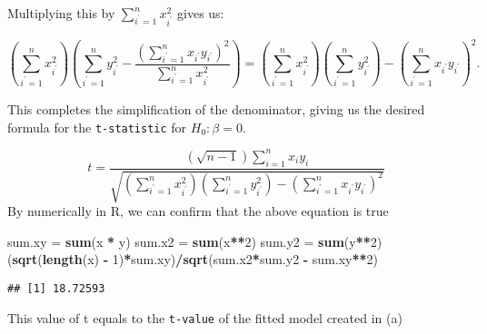 \documentclass[
]{article}
\newenvironment{Shaded}{\begin{snugshade}}{\end{snugshade}}
\newcommand{\DecValTok}[1]{\textcolor[rgb]{0.00,0.00,0.81}{#1}}
\newcommand{\FunctionTok}[1]{\textcolor[rgb]{0.13,0.29,0.53}{\textbf{#1}}}
\newcommand{\NormalTok}[1]{#1}
\newcommand{\OtherTok}[1]{\textcolor[rgb]{0.56,0.35,0.01}{#1}}
\newcommand{\SpecialCharTok}[1]{\textcolor[rgb]{0.81,0.36,0.00}{\textbf{#1}}}
\newcommand{\StringTok}[1]{\textcolor[rgb]{0.31,0.60,0.02}{#1}}
\begin{document}
Multiplying this by \(\sum_{i^{\prime} = 1}^n x_{i^{\prime}}^2\) gives
us:

\[
   \left( \sum_{i^{\prime} = 1}^n x_{i^{\prime}}^2 \right)\left(\sum_{i^{\prime} = 1}^n y_{i^{\prime}}^2 - \frac{\left( \sum_{i^{\prime} = 1}^n x_{i^{\prime}}y_{i^{\prime}} \right)^2}{\sum_{i^{\prime} = 1}^n x_{i^{\prime}}^2}\right) =\left( \sum_{i^{\prime} = 1}^n x_{i^{\prime}}^2 \right) \left( \sum_{i^{\prime} = 1}^n y_{i^{\prime}}^2 \right) - \left( \sum_{i^{\prime} = 1}^n x_{i^{\prime}}y_{i^{\prime}} \right)^2.
\]

This completes the simplification of the denominator, giving us the
desired formula for the \texttt{t-statistic} for \(H_0: \beta = 0\).

\[
    t = \frac{\left( \sqrt{n-1} \right) \sum_{i = 1}^n x_iy_i}
    {\sqrt{\left( \sum_{i^{\prime} = 1}^n x_{i^{\prime}}^2 \right) \left( \sum_{i^{\prime} = 1}^n y_{i^{\prime}}^2 \right) - \left( \sum_{i^{\prime} = 1}^n x_{i^{\prime}}y_{i^{\prime}} \right)^2}}
\] By numerically in R, we can confirm that the above equation is true

\begin{Shaded}
\begin{Highlighting}[]
\NormalTok{sum.xy }\OtherTok{=} \FunctionTok{sum}\NormalTok{(x }\SpecialCharTok{*}\NormalTok{ y)}
\NormalTok{sum.x2 }\OtherTok{=} \FunctionTok{sum}\NormalTok{(x}\SpecialCharTok{**}\DecValTok{2}\NormalTok{)}
\NormalTok{sum.y2 }\OtherTok{=} \FunctionTok{sum}\NormalTok{(y}\SpecialCharTok{**}\DecValTok{2}\NormalTok{)}
\NormalTok{(}\FunctionTok{sqrt}\NormalTok{(}\FunctionTok{length}\NormalTok{(x) }\SpecialCharTok{{-}} \DecValTok{1}\NormalTok{)}\SpecialCharTok{*}\NormalTok{sum.xy)}\SpecialCharTok{/}\FunctionTok{sqrt}\NormalTok{(sum.x2}\SpecialCharTok{*}\NormalTok{sum.y2 }\SpecialCharTok{{-}}\NormalTok{ sum.xy}\SpecialCharTok{**}\DecValTok{2}\NormalTok{)}
\end{Highlighting}
\end{Shaded}

\begin{verbatim}
## [1] 18.72593
\end{verbatim}

This value of t equals to the \texttt{t-value} of the fitted model
created in (a)

\begin{Shaded}
\end{Shaded}
\end{document}
